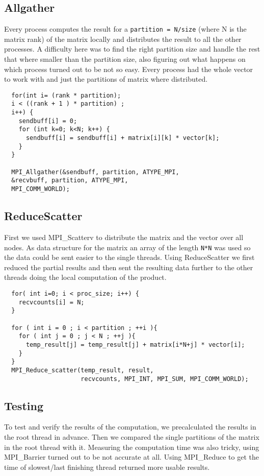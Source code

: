 \subsection{Allgather}


Every process computes the result for a \texttt{partition = N/size} (where  N is the matrix rank) of the matrix locally and distributes the result to all the other processes.
A difficulty here was to find the right partition size and handle the rest that where smaller than the partition size, also figuring out what happens on which process turned out to be not so easy.
Every process had the whole vector to work with and just the partitions of matrix where distributed.


\begin{lstlisting}
  for(int i= (rank * partition);
  i < ((rank + 1 ) * partition) ;
  i++) {
    sendbuff[i] = 0;
    for (int k=0; k<N; k++) {
      sendbuff[i] = sendbuff[i] + matrix[i][k] * vector[k];
    }
  }

  MPI_Allgather(&sendbuff, partition, ATYPE_MPI,
  &recvbuff, partition, ATYPE_MPI,
  MPI_COMM_WORLD);
\end{lstlisting}



\subsection{ReduceScatter}

First we used MPI\_Scatterv to distribute the matrix and the vector over all nodes.
As data structure for the matrix an array of the length \texttt{N*N} was used so the data could be sent easier to the single threads. Using ReduceScatter we first reduced the partial results and then sent the resulting data further to the other threads doing the local computation of the product.

\begin{lstlisting}
  for( int i=0; i < proc_size; i++) {
    recvcounts[i] = N;
  }

  for ( int i = 0 ; i < partition ; ++i ){
    for ( int j = 0 ; j < N ; ++j ){
      temp_result[j] = temp_result[j] + matrix[i*N+j] * vector[i];
    }
  }
  MPI_Reduce_scatter(temp_result, result,
                     recvcounts, MPI_INT, MPI_SUM, MPI_COMM_WORLD);
\end{lstlisting}

\subsection{Testing}
To test and verify the results of the computation, we precalculated the results in the root thread in advance.
Then we compared the single partitions of the matrix in the root thread with it.
Measuring the computation time was also tricky, using MPI\_Barrier turned out to be not accurate at all.
Using MPI\_Reduce to get the time of slowest/last finishing thread returned more usable results.

